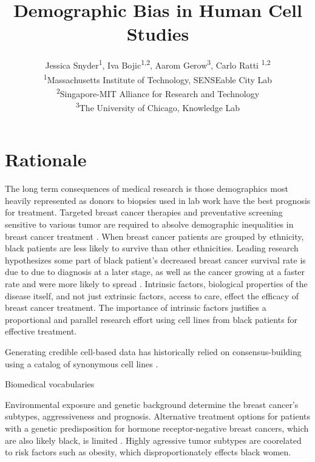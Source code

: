 \documentclass[11pt]{article}
\begin{document}
\title{Demographic Bias in Human Cell Studies }
\author{Jessica Snyder\textsuperscript{1}, Iva Bojic\textsuperscript{1,2}, Aarom Gerow\textsuperscript{3}, Carlo Ratti  \textsuperscript{1,2 } \\ \textsuperscript{1}Massachusetts Institute of Technology, SENSEable City Lab \\ \textsuperscript{2}Singapore-MIT Alliance for Research and Technology \\  \textsuperscript{3}The University of Chicago, Knowledge Lab }

\maketitle

\linenumbers
\begin{abstract} \end{abstract}


\section{Rationale}
The long term consequences of medical research is those demographics most heavily represented as donors to biopsies used in lab work have the best prognosis for treatment. Targeted breast cancer therapies and preventative screening sensitive to various tumor are required to absolve demographic inequalities in breast cancer treatment \cite{batina2013variation}.  When breast cancer patients are grouped by ethnicity, black patients are less likely to survive than other ethnicities. Leading research hypothesizes some part of black patient's decreased breast cancer survival rate is due to due to diagnosis at a later stage, as well as the cancer growing at a faster rate and were more likely to spread \cite{batina2013variation}. Intrinsic factors, biological properties of the disease itself, and not just extrinsic factors, access to care, effect the efficacy of breast cancer treatment. The importance of intrinsic factors justifies a proportional and parallel research effort using cell lines from black patients for effective treatment.

\cite{brennan2012there}

Generating credible cell-based data has historically relied on consensus-building  using a catalog of synonymous cell lines \cite{yu2015resource}. 
 
 Biomedical vocabularies

Environmental exposure and genetic background determine the breast cancer's subtypes, aggressiveness and prognosis. 
Alternative treatment options for patients with a genetic predisposition for hormone receptor-negative breast cancers, which are also likely black, is  limited \cite{huo2009population}. Highly agressive tumor subtypes are coorelated to risk factors such as obesity, which disproportionately effects black women. 
\end{document}
